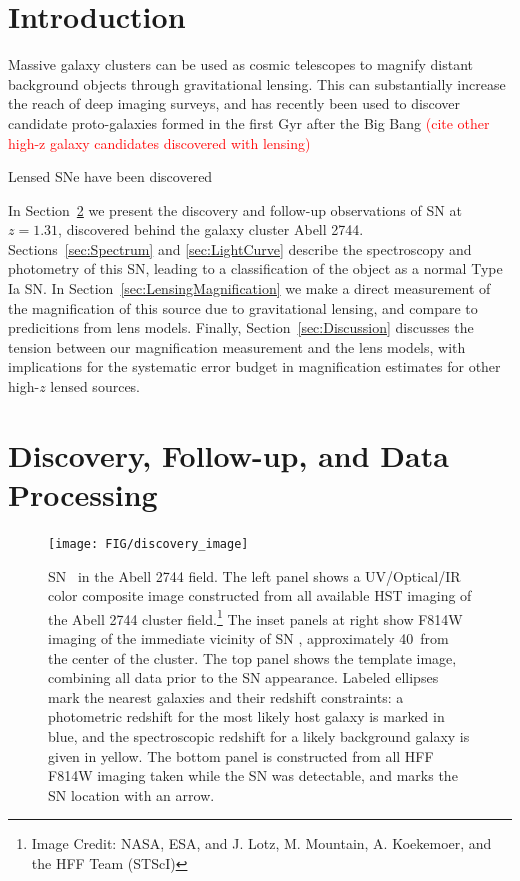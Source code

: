 
\section{Introduction}
\label{sec:Introduction}

Massive galaxy clusters can be used as cosmic telescopes to magnify
distant background objects through gravitational lensing.  This can
substantially increase the reach of deep imaging surveys, and has
recently been used to discover candidate proto-galaxies formed in the
first Gyr after the Big
Bang \citep{Zheng:2012,Coe:2013,} 
\textcolor{red}{(cite other high-z galaxy candidates discovered with lensing)}

Lensed SNe have been discovered
\citep{Goobar:2009,Riehm:2011,Patel:2014,Nordin:2014}

In Section~\ref{sec:DiscoveryAndFollowup} we present the discovery and
follow-up observations of SN \tomas at $z=1.31$, discovered behind the
galaxy cluster Abell 2744.  Sections~\ref{sec:Spectrum} and \ref{sec:LightCurve}
describe the spectroscopy and photometry of this SN, leading to a
classification of the object as a normal Type Ia SN.  In
Section~\ref{sec:LensingMagnification} we make a direct measurement of
the magnification of this source due to gravitational lensing, and
compare to predicitions from lens models.  Finally,
Section~\ref{sec:Discussion} discusses the tension between our
magnification measurement and the lens models, with implications for
the systematic error budget in magnification estimates for other
high-$z$ lensed sources.


\section{Discovery, Follow-up, and Data Processing}
\label{sec:DiscoveryAndFollowup}

\begin{figure}
\begin{center}
\texttt{[image: FIG/discovery\_image]}
\caption{  
SN \tomas\ in the Abell 2744 field.  The left panel shows a
UV/Optical/IR color composite image constructed from all available HST
imaging of the Abell 2744 cluster field.\footnote{Image Credit: NASA,
ESA, and J. Lotz, M. Mountain, A. Koekemoer, and the HFF Team
(STScI)}  The inset panels at right show F814W imaging of the
immediate vicinity of SN \tomas, approximately 40\arcsec\ from the
center of the cluster.  The top panel shows the template image,
combining all data prior to the SN appearance.  Labeled ellipses mark the nearest galaxies and their redshift constraints: a photometric redshift for the most likely host galaxy is marked in blue, and the spectroscopic redshift for a likely background galaxy is given in yellow. The bottom panel is
constructed from all HFF F814W imaging taken while the SN was detectable, and marks the SN location with an arrow.}
\end{center}
\end{figure}


